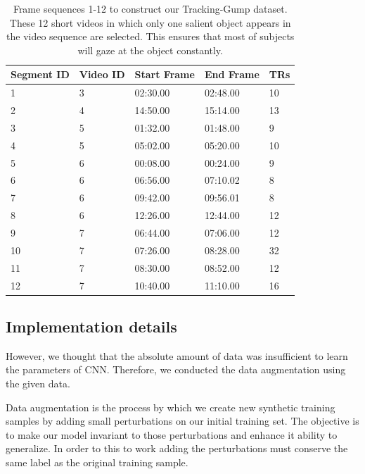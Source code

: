 \documentclass[final,3p,times,twocolumn]{elsarticle}
\begin{document}
\begin{table}[h]
	\centering
	\footnotesize
	\caption{Frame sequences 1-12 to construct our Tracking-Gump dataset.
	These 12 short videos in which only one salient object appears in the video sequence are selected. 
	This ensures that most of subjects will gaze at the object constantly.}
	
	\label{tab:track_seg}
	
	\begin{tabular}{p{1.0cm}<{\centering}p{0.9cm}<{\centering}p{1.6cm}<{\centering}p{1.5cm}<{\centering}p{0.7cm}<{\centering}}
		\toprule[1.5pt]
		Segment ID & Video ID  & Start Frame    & End Frame  & TRs   \\ \midrule[1pt]
		1     		  & 3 			   & 02:30.00 	   & 02:48.00  & 10  		  \\
		2  	 		  & 4 			   & 14:50.00 	   & 15:14.00  & 13   		  \\
		3   		  & 5 			   & 01:32.00 	   & 01:48.00  & 9   		  \\
		4   		  & 5 			   & 05:02.00  	   & 05:20.00  & 10   		  \\
		5   		  & 6 			   & 00:08.00 	   & 00:24.00  & 9   		  \\
		6   		  & 6 			   & 06:56.00 	   & 07:10.02  & 8   		  \\
		7   		  & 6 			   & 09:42.00  	   & 09:56.01  & 8   		  \\
		8   		  & 6 			   & 12:26.00 	   & 12:44.00  & 12		      \\
		9   		  & 7  			   & 06:44.00 	   & 07:06.00  & 12		      \\
		10  		  & 7 			   & 07:26.00 	   & 08:28.00  & 32		      \\
		11  		  & 7 			   & 08:30.00 	   & 08:52.00  & 12		      \\
		12 			  & 7 			   & 10:40.00 	   & 11:10.00  & 16		      \\
		\bottomrule[1.5pt]
	\end{tabular}
	
\end{table}


\subsection{Implementation details}
However, we thought that the absolute amount of data was insufficient to learn the parameters of CNN.
Therefore, we conducted the data augmentation using the given data.


Data augmentation is the process by which we create new synthetic training samples by adding small perturbations on our initial training set.
The objective is to make our model invariant to those perturbations and enhance it ability to generalize.
In order to this to work adding the perturbations must conserve the same label as the original training sample.
\end{document}
